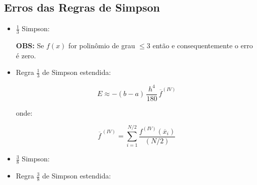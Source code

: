 \subsection{Erros das Regras de Simpson}

\begin{itemize}

\item $ \displaystyle \frac{1}{3}$ Simpson: 

\textbf{OBS:} Se $f(x)$ for polinômio de grau $\leq 3$ então  e consequentemente o erro é zero.

\item Regra $ \displaystyle \frac{1}{3}$ de Simpson estendida:

\[
 E \approx - (b - a) \, \frac{h^4}{180} \, \overline{f}^{(IV)}
\]

onde: 

\[
 \overline{f}^{\,(IV)} = \sum_{i=1}^{N/2} \frac{f^{(IV)}(\overline{x}_i)}{(N/2)}
\]

\item $ \displaystyle \frac{3}{8}$ Simpson: 

\item Regra $ \displaystyle \frac{3}{8}$ de Simpson estendida: 

\end{itemize}

